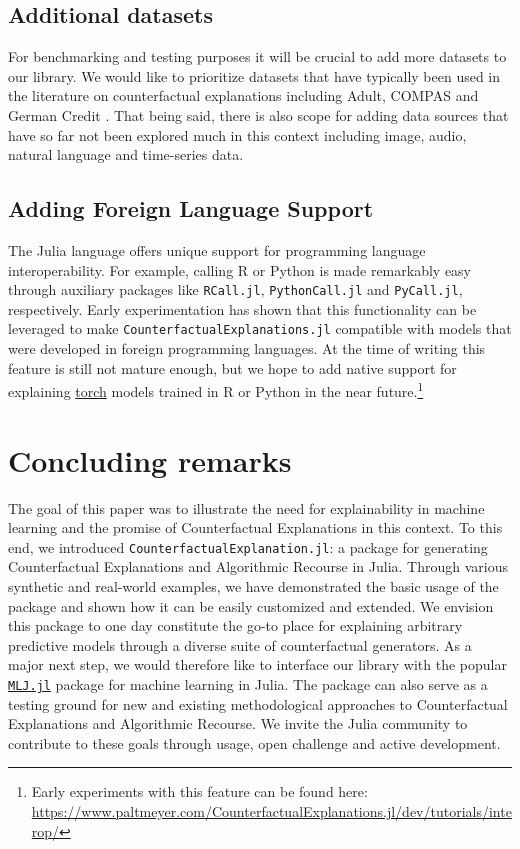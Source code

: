 \documentclass{juliacon}
\begin{document}
\hypertarget{additional-datasets}{%
\subsection{Additional datasets}\label{additional-datasets}}

For benchmarking and testing purposes it will be crucial to add more
datasets to our library. We would like to prioritize datasets that have
typically been used in the literature on counterfactual explanations
including Adult, COMPAS and German Credit \cite{karimi2020survey}. That
being said, there is also scope for adding data sources that have so far
not been explored much in this context including image, audio, natural
language and time-series data.

\hypertarget{sec-dis-foreign}{%
\subsection{Adding Foreign Language Support}\label{sec-dis-foreign}}

The Julia language offers unique support for programming language
interoperability. For example, calling R or Python is made remarkably
easy through auxiliary packages like \texttt{RCall.jl},
\texttt{PythonCall.jl} and \texttt{PyCall.jl}, respectively. Early
experimentation has shown that this functionality can be leveraged to
make \texttt{CounterfactualExplanations.jl} compatible with models that
were developed in foreign programming languages. At the time of writing
this feature is still not mature enough, but we hope to add native
support for explaining \href{https://pytorch.org/}{torch} models trained
in R or Python in the near future.\footnote{Early experiments with this
  feature can be found here:
  \url{https://www.paltmeyer.com/CounterfactualExplanations.jl/dev/tutorials/interop/}}

\hypertarget{sec-conclude}{%
\section{Concluding remarks}\label{sec-conclude}}

The goal of this paper was to illustrate the need for explainability in
machine learning and the promise of Counterfactual Explanations in this
context. To this end, we introduced
\texttt{CounterfactualExplanation.jl}: a package for generating
Counterfactual Explanations and Algorithmic Recourse in Julia. Through
various synthetic and real-world examples, we have demonstrated the
basic usage of the package and shown how it can be easily customized and
extended. We envision this package to one day constitute the go-to place
for explaining arbitrary predictive models through a diverse suite of
counterfactual generators. As a major next step, we would therefore like
to interface our library with the popular
\href{https://alan-turing-institute.github.io/MLJ.jl/dev/}{\texttt{MLJ.jl}}
package for machine learning in Julia. The package can also serve as a
testing ground for new and existing methodological approaches to
Counterfactual Explanations and Algorithmic Recourse. We invite the
Julia community to contribute to these goals through usage, open
challenge and active development.
\end{document}

